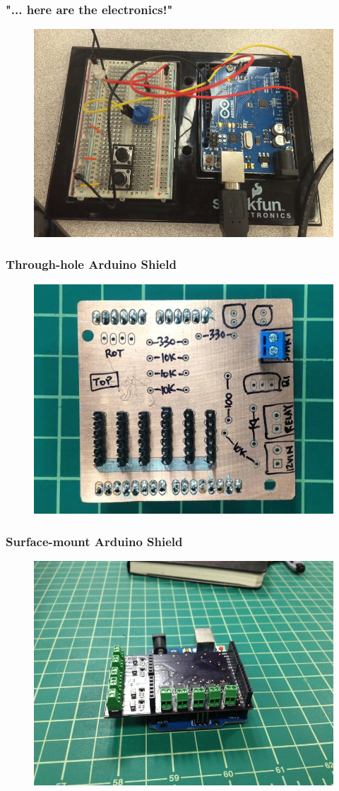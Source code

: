 \documentclass{beamer}
\begin{document}
\begin{frame}
\frametitle{"... here are the electronics!"}
\begin{figure}
\includegraphics[width=0.8\linewidth]{breadboard.png}
\end{figure}
\end{frame}
\begin{frame}
\frametitle{Through-hole Arduino Shield}
\begin{figure}
\includegraphics[width=0.8\linewidth]{ovenboard-top.png}
\end{figure}
\end{frame}
\begin{frame}
\frametitle{Surface-mount Arduino Shield}
\begin{figure}
\includegraphics[width=0.8\linewidth]{ovenboard3-side.png}
\end{figure}
\end{frame}
\end{document}
